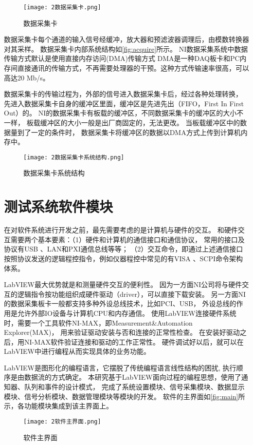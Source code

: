\begin{figure}[htbp]
    \centering
    \texttt{[image: 2数据采集卡.png]}
    \caption{\label{fig:acquireNI}数据采集卡}
\end{figure}
​
数据采集卡每个通道的输入信号经缓冲，放大器和预滤波器调理后，由模数转换器对其采样。
数据采集卡内部系统结构如\autoref{fig:acquire}所示。
NI数据采集系统中数据传输方式默认是使用直接内存访问(DMA)传输方式
DMA是一种DAQ板卡和PC内存间直接通讯的传输方式，不再需要处理器的干预。这种方式传输速率很高，可以高达20 Mb/s。

数据采集卡的传输过程为，外部的信号进入数据采集卡后，经过各种处理转换，
先进入数据采集卡自身的缓冲区里面，缓冲区是先进先出（FIFO，First In First Out）的。
NI的数据采集卡有板载的缓冲区，不同数据采集卡的缓冲区的大小不一样，
板载缓冲区的大小一般是出厂商固定的，无法更改。
当板载缓冲区中的数据量到了一定的条件时，
数据采集卡将缓冲区的数据以DMA方式上传到计算机内存中。
\begin{figure}[htbp]
    \centering
    \texttt{[image: 2数据采集卡系统结构.png]}
    \caption{\label{fig:acquire}数据采集卡系统结构}
\end{figure}

\section{测试系统软件模块}
在对软件系统进行开发之前，最先需要考虑的是计算机与硬件的交互。
和硬件交互需要两个基本要素：（1）硬件和计算机的通信接口和通信协议，
常用的接口及协议有USB 、LAN和PXI通信总线等等；
（2）交互命令，即通过上述通信接口按照协议发送的逻辑程控指令，例如仪器程控中常见的有VISA 、SCPI命令架构体系。

LabVIEW最大优势就是和测量硬件交互的便利性。
因为一方面NI公司将与硬件交互的逻辑指令按功能组织成硬件驱动（driver），可以直接下载安装。
另一方面NI的数据采集板卡一般都支持多种外设总线技术，比如PCI、USB，
外设总线的作用是允许外部IO设备与计算机CPU和内存通信。
使用LabVIEW连接硬件系统时，需要一个工具软件NI-MAX，即Measurement\&Automation Explorer(MAX)，
用来验证驱动安装与否和连接的正常性检查。
在安装好驱动之后，用NI-MAX软件验证连接和驱动的工作正常性。
硬件调试好以后，就可以在LabVIEW中进行编程从而实现具体的业务功能。

LabVIEW是图形化的编程语言，它摆脱了传统编程语言线性结构的困扰, 
执行顺序是由数据流的方式确定。
本研究基于LabVIEW面向过程的编程思想，使用了通知器、队列和事件的设计模式，
完成了系统设置模块、信号采集模块、数据显示模块、信号分析模块、数据管理模块等模块的开发。
软件的主界面如\autoref{fig:main}所示，各功能模块集成到该主界面上。
\begin{figure}[htbp]
    \centering
    \texttt{[image: 2软件主界面.png]}
    \caption{\label{fig:main}软件主界面}
\end{figure}

